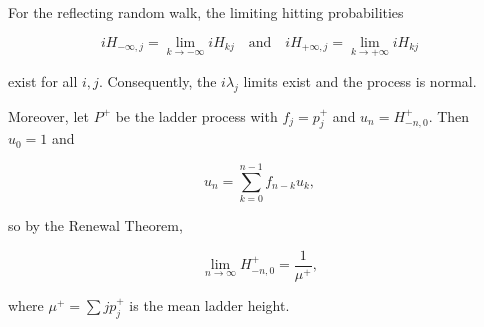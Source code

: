For the reflecting random walk, the limiting hitting probabilities

$$iH_{-\infty,j} = \lim_{k \to -\infty} iH_{kj} \quad \text{and} \quad iH_{+\infty,j} = \lim_{k \to +\infty} iH_{kj}$$

exist for all $i, j$. Consequently, the $i\lambda_j$ limits exist and the process is normal.

Moreover, let $P^+$ be the ladder process with $f_j = p_j^+$ and $u_n = H_{-n,0}^+$. Then $u_0 = 1$ and

$$u_n = \sum_{k=0}^{n-1} f_{n-k} u_k,$$

so by the Renewal Theorem,

$$\lim_{n \to \infty} H_{-n,0}^+ = \frac{1}{\mu^+},$$

where $\mu^+ = \sum j p_j^+$ is the mean ladder height.

